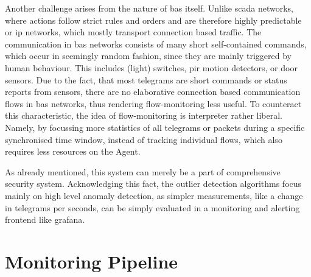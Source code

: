 Another challenge arises from the nature of \gls{bas} itself. Unlike \gls{scada} networks, where actions follow strict rules and orders and are therefore highly predictable or \gls{ip} networks, which mostly transport connection based traffic. The communication in \gls{bas} networks consists of many short self-contained commands, which occur in seemingly random fashion, since they are mainly triggered by human behaviour. This includes (light) switches, \gls{pir} motion detectors, or door sensors.
Due to the fact, that most telegrams are short commands or status reports from sensors, there are no elaborative connection based communication flows in \gls{bas} networks, thus rendering flow-monitoring less useful.
To counteract this  characteristic, the idea of flow-monitoring is interpreter rather liberal. 
Namely, by focussing more statistics of all telegrams or packets during a specific synchronised time window, instead of tracking individual flows, which also requires less resources on the Agent.

As already mentioned, this system can merely be a part of comprehensive security system. Acknowledging this fact, the outlier detection algorithms focus mainly on high level anomaly detection, as simpler measurements, like a change in telegrams per seconds, can be simply evaluated in a monitoring and alerting frontend like \gls{grafana}.

\section{Monitoring Pipeline}
\label{sec:concept:pipeline}

